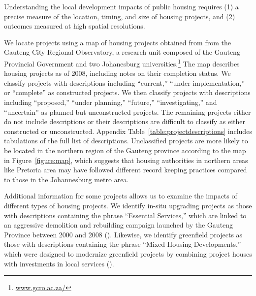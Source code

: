 \documentclass[12pt]{article}
\begin{document}

Understanding the local development impacts of public housing requires (1) a precise measure of the location, timing, and size of housing projects, and (2) outcomes measured at high spatial resolutions.

We locate projects using a map of housing projects obtained from from the Gauteng City Regional Observatory, a research unit composed of the Gauteng Provincial Government and two Johanesburg universities.\footnote{\href{url}{www.gcro.ac.za/}} The map describes housing projects as of 2008, including notes on their completion status.  We classify projects with descriptions including ``current,'' ``under implementation,'' or ``complete'' as constructed projects.  We then classify projects with descriptions including ``proposed,'' ``under planning,'' ``future,'' ``investigating,'' and ``uncertain'' as planned but unconstructed projects.  The remaining projects either do not include descriptions or their descriptions are difficult to classify as either constructed or unconstructed.  Appendix Table~\ref{table:projectdescriptions} includes tabulations of the full list of descriptions.  Unclassified projects are more likely to be located in the northern region of the Gauteng province according to the map in Figure~\ref{figure:map}, which suggests that housing authorities in northern areas like Pretoria area may have followed different record keeping practices compared to those in the Johannesburg metro area.  

Additional information for some projects allows us to examine the impacts of different types of housing projects.  We identify in-situ upgrading projects as those with descriptions containing the phrase ``Essential Services,'' which are linked to an aggressive demolition and rebuilding campaign launched by the Gauteng Province between 2000 and 2008 (\cite{hofmeyr2008risk}).  Likewise, we identify greenfield projects as those with descriptions containing the phrase ``Mixed Housing Developments,'' which were designed to modernize greenfield projects by combining project houses with investments in local services (\cite{greenfield}).
\end{document}
